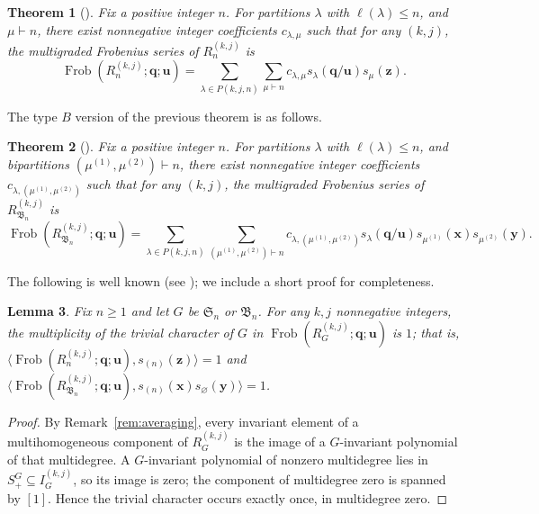 \documentclass[12pt]{amsart}
\theoremstyle{plain}
\newtheorem{theorem}{Theorem}[section]
\newtheorem{lemma}[theorem]{Lemma}
\theoremstyle{definition}
\DeclareMathOperator{\Frob}{Frob}
\newcommand{\x}{\mathbf{x}}
\newcommand{\y}{\mathbf{y}}
\newcommand{\z}{\mathbf{z}}
\begin{document}
\begin{theorem}[{\cite[Corollary 1.3]{Lentfer-Supersymmetry}}]\label{thm:DSS}
    Fix a positive integer $n$. 
    For partitions $\lambda$ with $\ell(\lambda) \leq n$, and $\mu \vdash n$, there exist nonnegative integer coefficients $c_{\lambda,\mu}$ such that for any $(k,j)$, the multigraded Frobenius series of $R_n^{(k,j)}$ is
\begin{equation}\label{eq:DSS}
    \Frob(R_n^{(k,j)}; \mathbf{q};\mathbf{u}) = \sum_{\lambda \in P(k,j,n)} \sum_{\mu \vdash n} c_{\lambda,\mu} s_\lambda(\mathbf{q}/\mathbf{u})s_\mu(\z).
\end{equation}
\end{theorem}

The type $B$ version of the previous theorem is as follows. 

\begin{theorem}[{\cite[Theorem 1.2]{Lentfer-Supersymmetry}}]\label{thm:DSS-B_n}
    Fix a positive integer $n$. 
    For partitions $\lambda$ with $\ell(\lambda) \leq n$, and bipartitions $(\mu^{(1)},\mu^{(2)}) \vdash n$, there exist nonnegative integer coefficients $c_{\lambda,(\mu^{(1)},\mu^{(2)})}$ such that for any $(k,j)$, the multigraded Frobenius series of $R_{\mathfrak{B}_n}^{(k,j)}$ is
\begin{equation}\label{eq:DSS-B_n}
    \Frob(R_{\mathfrak{B}_n}^{(k,j)}; \mathbf{q};\mathbf{u}) = \sum_{\lambda \in P(k,j,n)} \sum_{(\mu^{(1)},\mu^{(2)}) \vdash n} c_{\lambda,(\mu^{(1)},\mu^{(2)})} s_\lambda(\mathbf{q}/\mathbf{u})s_{\mu^{(1)}}(\x)s_{\mu^{(2)}}(\y).
\end{equation}
\end{theorem}

The following is well known (see \cite[Proposition 1.2.2]{Haiman1994}); we include a short proof for completeness.

\begin{lemma}\label{lem:trivial}
    Fix $n \geq 1$ and let $G$ be $\mathfrak{S}_n$ or $\mathfrak{B}_n$. 
    For any $k,j$ nonnegative integers, the multiplicity of the trivial character of $G$ in $\Frob(R_G^{(k,j)}; \mathbf{q};\mathbf{u})$ is $1$; that is, $\langle \Frob(R_n^{(k,j)}; \mathbf{q};\mathbf{u}), s_{(n)}(\z)\rangle \allowbreak= 1$ and $\langle \Frob(R_{\mathfrak{B}_n}^{(k,j)}; \mathbf{q};\mathbf{u}), s_{(n)}(\x)s_\varnothing(\y)\rangle = 1$.
\end{lemma}

\begin{proof}
    By Remark~\ref{rem:averaging}, every invariant element of a multihomogeneous component of $R_G^{(k,j)}$ is the image of a $G$-invariant polynomial of that multidegree. 
    A $G$-invariant polynomial of nonzero multidegree lies in $S_+^{G} \subseteq I_G^{(k,j)}$, so its image is zero; the component of multidegree zero is spanned by $[1]$. Hence the trivial character occurs exactly once, in multidegree zero.
\end{proof}
\end{document}
